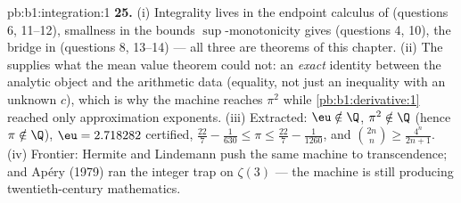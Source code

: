 \begin{solution}{pb:b1:integration:1}
\textbf{25.} (i) Integrality lives in the endpoint calculus of
 (questions 6, 11--12), smallness in the bounds
$\sup$-monotonicity gives (questions 4, 10), the bridge in
 (questions 8, 13--14) --- all three are
theorems of this chapter. (ii) The  supplies what the
mean value theorem could not: an \emph{exact} identity between
the analytic object and the arithmetic data (equality, not just
an inequality with an unknown $c$), which is why the machine
reaches $\pi^2$ while \cref{pb:b1:derivative:1} reached only
approximation exponents. (iii) Extracted: $\eu \notin \Q$,
$\pi^2 \notin \Q$ (hence $\pi \notin \Q$), $\eu = 2.718282$
certified, $\frac{22}{7} - \frac{1}{630} \leq \pi \leq
\frac{22}{7} - \frac{1}{1260}$, and $\binom{2n}{n} \geq
\frac{4^n}{2n+1}$. (iv) Frontier: Hermite and Lindemann push
the same machine to transcendence; and Ap\'ery (1979) ran the
integer trap on $\zeta(3)$ --- the machine is still producing
twentieth-century mathematics.
\end{solution}
